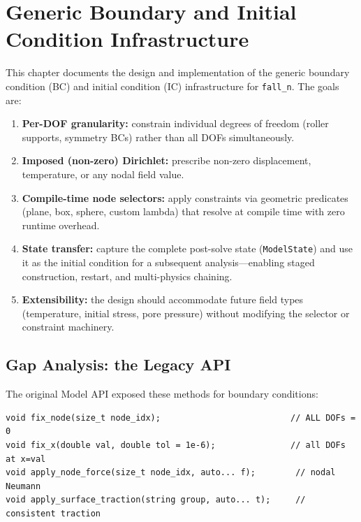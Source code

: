 \chapter{Generic Boundary and Initial Condition Infrastructure}
\label{ch:boundary-conditions}

This chapter documents the design and implementation of the generic
boundary condition (BC) and initial condition (IC) infrastructure for
\texttt{fall\_n}.  The goals are:
\begin{enumerate}[nosep]
  \item \textbf{Per-DOF granularity:}  constrain individual degrees of freedom
        (roller supports, symmetry BCs) rather than all DOFs simultaneously.
  \item \textbf{Imposed (non-zero) Dirichlet:}  prescribe non-zero
        displacement, temperature, or any nodal field value.
  \item \textbf{Compile-time node selectors:}  apply constraints via
        geometric predicates (plane, box, sphere, custom lambda) that
        resolve at compile time with zero runtime overhead.
  \item \textbf{State transfer:}  capture the complete post-solve state
        (\texttt{ModelState}) and use it as the initial condition for
        a subsequent analysis---enabling staged construction, restart,
        and multi-physics chaining.
  \item \textbf{Extensibility:}  the design should accommodate future
        field types (temperature, initial stress, pore pressure) without
        modifying the selector or constraint machinery.
\end{enumerate}


\section{Gap Analysis: the Legacy API}
\label{sec:bc-gap}

The original Model API exposed these methods for boundary conditions:

\begin{lstlisting}
void fix_node(size_t node_idx);                          // ALL DOFs = 0
void fix_x(double val, double tol = 1e-6);               // all DOFs at x=val
void apply_node_force(size_t node_idx, auto... f);        // nodal Neumann
void apply_surface_traction(string group, auto... t);     // consistent traction
\end{lstlisting}

